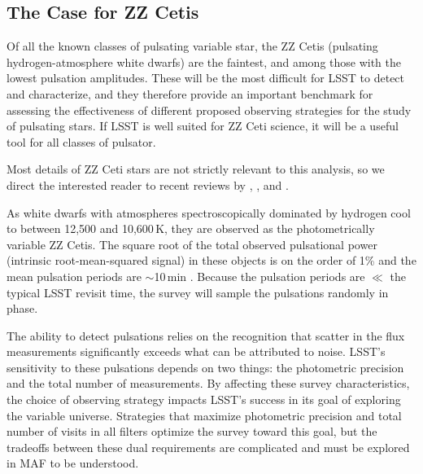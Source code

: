\subsection{The Case for ZZ Cetis}
\label{sec:\secname:targets}

Of all the known classes of pulsating variable star, the ZZ Cetis
(pulsating hydrogen-atmosphere white dwarfs) are the faintest, and among
those with the lowest pulsation amplitudes.  These will be the most
difficult for LSST to detect and characterize, and they therefore
provide an important benchmark for assessing the effectiveness of
different proposed observing strategies for the study of pulsating
stars.  If LSST is well suited for ZZ Ceti science, it will be a useful
tool for all classes of pulsator.

Most details of ZZ Ceti stars are not strictly relevant to this
analysis, so we direct the interested reader to recent reviews by
\citet{2008ARA&A..46..157W}, \citet{2008PASP..120.1043F}, and
\citet{2010A&ARv..18..471A}.

As white dwarfs with atmospheres spectroscopically dominated by hydrogen
cool to between 12,500 and 10,600\,K, they are observed as the
photometrically variable ZZ Cetis.  The square root of the total
observed pulsational power (intrinsic root-mean-squared signal) in these
objects is on the order of 1\% and the mean pulsation periods are
$\sim$10\,min \citep{2006ApJ...640..956M}.  Because the pulsation
periods are $\ll$ the typical LSST revisit time, the survey will sample
the pulsations randomly in phase.

The ability to detect pulsations relies on the recognition that scatter
in the flux measurements significantly exceeds what can be attributed to
noise.  LSST's sensitivity to these pulsations depends on two things:
the photometric precision and the total number of measurements.  By
affecting these survey characteristics, the choice of observing strategy
impacts LSST's success in its goal of exploring the variable universe.
Strategies that maximize photometric precision and total number of
visits in all filters optimize the survey toward this goal, but the
tradeoffs between these dual requirements are complicated and must be
explored in MAF to be understood.

